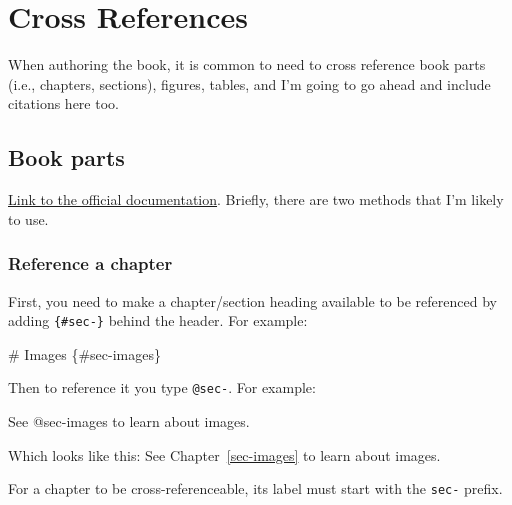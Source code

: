 \documentclass[
  letterpaper,
  DIV=11,
  numbers=noendperiod]{scrreprt}
\newenvironment{Shaded}{\begin{snugshade}}{\end{snugshade}}
\newcommand{\FunctionTok}[1]{\textcolor[rgb]{0.28,0.35,0.67}{#1}}
\newcommand{\NormalTok}[1]{\textcolor[rgb]{0.00,0.23,0.31}{#1}}
\begin{document}
\chapter{Cross References}\label{sec-crossrefs}

When authoring the book, it is common to need to cross reference book
parts (i.e., chapters, sections), figures, tables, and I'm going to go
ahead and include citations here too.

\section{Book parts}\label{book-parts}

\href{https://quarto.org/docs/books/book-crossrefs.html}{Link to the
official documentation}. Briefly, there are two methods that I'm likely
to use.

\subsection{Reference a chapter}\label{reference-a-chapter}

First, you need to make a chapter/section heading available to be
referenced by adding \texttt{\{\#sec-\}} behind the header. For example:

\begin{Shaded}
\begin{Highlighting}[]
\FunctionTok{\# Images \{\#sec{-}images\}}
\end{Highlighting}
\end{Shaded}

Then to reference it you type \texttt{@sec-}. For example:

\begin{Shaded}
\begin{Highlighting}[]
\NormalTok{See @sec{-}images to learn about images.}
\end{Highlighting}
\end{Shaded}

Which looks like this: See Chapter~\ref{sec-images} to learn about
images.

\begin{tcolorbox}[enhanced jigsaw, breakable, title=\textcolor{quarto-callout-important-color}{\faExclamation}\hspace{0.5em}{Label Prefix}, bottomrule=.15mm, coltitle=black, left=2mm, colbacktitle=quarto-callout-important-color!10!white, colback=white, toprule=.15mm, leftrule=.75mm, arc=.35mm, colframe=quarto-callout-important-color-frame, bottomtitle=1mm, toptitle=1mm, opacityback=0, titlerule=0mm, opacitybacktitle=0.6, rightrule=.15mm]

For a chapter to be cross-referenceable, its label must start with the
\texttt{sec-} prefix.

\end{tcolorbox}
\end{document}
